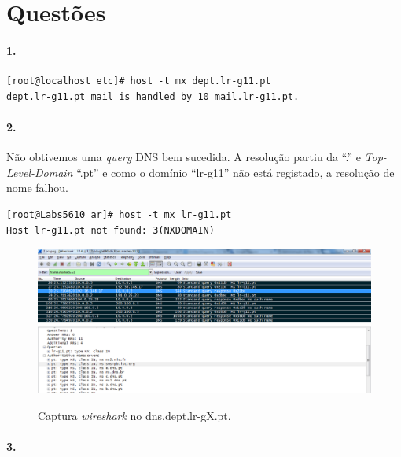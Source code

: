 \section*{Questões}
\paragraph{1.}

\begin{verbatim}
[root@localhost etc]# host -t mx dept.lr-g11.pt
dept.lr-g11.pt mail is handled by 10 mail.lr-g11.pt.
\end{verbatim}


\paragraph{2.}
Não obtivemos uma \emph{query} DNS bem sucedida.
A resolução partiu da  \textsf{``.''} e \emph{Top-Level-Domain} \textsf{``.pt''} e como o domínio \textsf{``lr-g11''} não está registado,
a resolução de nome falhou.

\begin{verbatim}
[root@Labs5610 ar]# host -t mx lr-g11.pt
Host lr-g11.pt not found: 3(NXDOMAIN)
\end{verbatim} 

\begin{figure}[h]
\centering
\includegraphics[width=1\textwidth, height=0.33\textheight]{2_cap.png}
\label{fig:2-capturaWireshark}
\caption{Captura \emph{wireshark} no \textsf{dns.dept.lr-gX.pt}.}
\end{figure}


\paragraph{3.}

